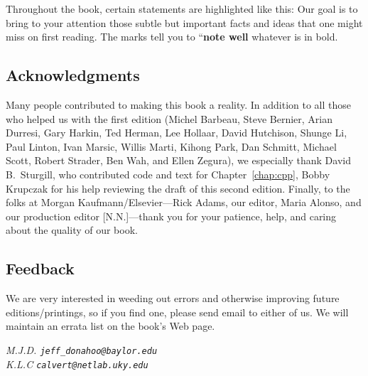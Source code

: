 Throughout the book, certain statements are highlighted like this:
  Our goal is to bring
to your attention those subtle but important facts and ideas that one
might miss on first reading.  The marks tell you to ``\textbf{note
well} whatever is in bold.


\subsection*{Acknowledgments}

Many people contributed to making this
book a reality.  In addition to all those who helped us with the first
edition (Michel Barbeau, Steve Bernier,
Arian Durresi,
Gary Harkin, Ted Herman,
Lee Hollaar, David Hutchison, Shunge Li, Paul Linton,
Ivan Marsic, Willis Marti,
Kihong Park, Dan Schmitt, Michael Scott,  Robert Strader, 
Ben Wah,
and Ellen Zegura), we especially thank David B.\ Sturgill, who
contributed code and text for Chapter~\ref{chap:cpp}, 
%
Bobby Krupczak for
his help reviewing the draft of this second edition.
Finally, to the folks at Morgan Kaufmann/Elsevier---Rick Adams, our
editor, Maria Alonso, and our production editor [N.N.]---thank you for
your patience, help, and caring about the quality of our book.

\subsection*{Feedback}

We are very interested in weeding out
errors and otherwise
improving future editions/printings, so if you find one, please send
email to either of us.  We will maintain an errata list on the book's
Web page.

\vspace{1.4ex}
\noindent
\textsl{
M.J.D. \texttt{jeff\_donahoo@baylor.edu}\\
K.L.C \texttt{calvert@netlab.uky.edu}
}


